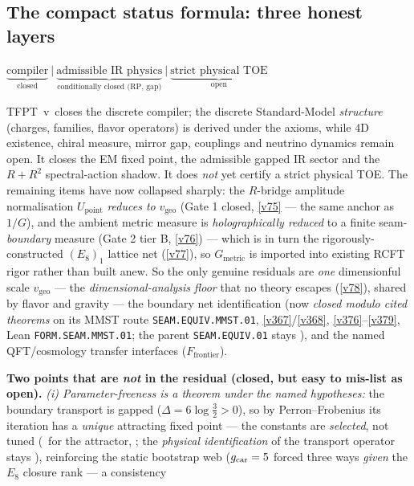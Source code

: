 \subsection*{The compact status formula: three honest layers}
\begin{keyeq}
$\displaystyle \underbrace{\text{compiler}}_{\text{closed}}\ \Big|\
  \underbrace{\text{admissible IR physics}}_{\text{conditionally closed (RP, gap)}}\ \Big|\
  \underbrace{\text{strict physical TOE}}_{\text{open}}$
\end{keyeq}
TFPT~v\TFPTversion\ closes the discrete compiler; the discrete Standard-Model \emph{structure} (charges, families, flavor operators) is derived under the axioms, while $4$D existence, chiral measure, mirror gap, couplings and neutrino dynamics remain open.  It closes the EM fixed point, the
admissible gapped IR sector and the $R+R^2$ spectral-action shadow. It does \emph{not} yet certify a strict
physical TOE. The remaining items have now collapsed sharply: the $R$-bridge amplitude normalisation
$U_{\mathrm{point}}$ \emph{reduces to} $v_{\mathrm{geo}}$ (Gate 1 closed, \vref{v75} --- the same anchor as $1/G$), and
the ambient metric measure is \emph{holographically reduced} to a finite seam-\emph{boundary} measure (Gate 2
tier B, \vref{v76}) --- which is in turn the rigorously-constructed $(E_8)_1$ lattice net (\vref{v77}), so $G_{\mathrm{metric}}$
is imported into existing RCFT rigor rather than built anew. So the only genuine residuals are \emph{one}
dimensionful scale $v_{\mathrm{geo}}$ --- the \emph{dimensional-analysis floor} that no theory escapes (\vref{v78}),
shared by flavor and gravity --- the boundary net identification (now \emph{closed modulo cited theorems} on its
MMST route \texttt{SEAM.EQUIV.MMST.01},
\vref{v367}/\vref{v368}, \vref{v376}--\vref{v379}, Lean \texttt{FORM.SEAM.MMST.01}; the parent
\texttt{SEAM.EQUIV.01} stays \mO), and the named QFT/cosmology transfer
interfaces ($F_{\mathrm{frontier}}$).
\par\smallskip\noindent\textbf{Two points that are \emph{not} in the residual (closed, but easy to mis-list as open).}
\emph{(i) Parameter-freeness is a theorem under the named hypotheses:} the boundary transport is gapped
($\Delta=6\log\tfrac32>0$), so by Perron--Frobenius its iteration has a \emph{unique} attracting fixed point
--- the constants are \emph{selected}, not tuned (\mE\ for the attractor, ;
the \emph{physical identification} of the transport operator stays \mC), reinforcing the
static bootstrap web ($g_{\mathrm{car}}=5$ forced three ways \emph{given} the $E_8$ closure rank --- a consistency
